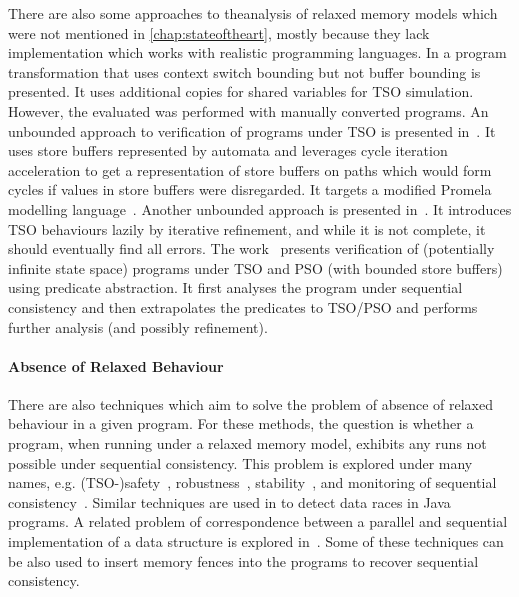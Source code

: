 There are also some approaches to  theanalysis of relaxed memory models which were not mentioned in \autoref{chap:stateoftheart}, mostly because they lack implementation which works with realistic programming languages.
In  a program transformation that uses context switch bounding but not buffer bounding is presented. It uses additional copies for shared variables for TSO simulation. However, the evaluated was performed with manually converted programs.
An unbounded approach to verification of programs under TSO is presented in~.
It uses store buffers represented by automata and leverages cycle iteration acceleration to get a representation of store buffers on paths which would form cycles if values in store buffers were disregarded.
It targets a modified Promela modelling language~.
Another unbounded approach is presented in~.
It introduces TSO behaviours lazily by iterative refinement, and while it is not complete, it should eventually find all errors.
The work~ presents verification of (potentially infinite state space) programs under TSO and PSO (with bounded store buffers) using predicate abstraction. It first analyses the program under sequential consistency and then extrapolates the predicates to TSO/PSO and performs further analysis (and possibly refinement).

\paragraph{Absence of Relaxed Behaviour}

There are also techniques which aim to solve the problem of absence of relaxed behaviour in a given program.
For these methods, the question is whether a program, when running under a relaxed memory model, exhibits any runs not possible under sequential consistency.
This problem is explored under many names, e.g. (TSO-)safety~, robustness~, stability~, and monitoring of sequential consistency~.
Similar techniques are used in  to detect data races in Java programs.
A related problem of correspondence between a parallel and sequential implementation of a data structure is explored in~.
Some of these techniques can be also used to insert memory fences into the programs to recover sequential consistency.

